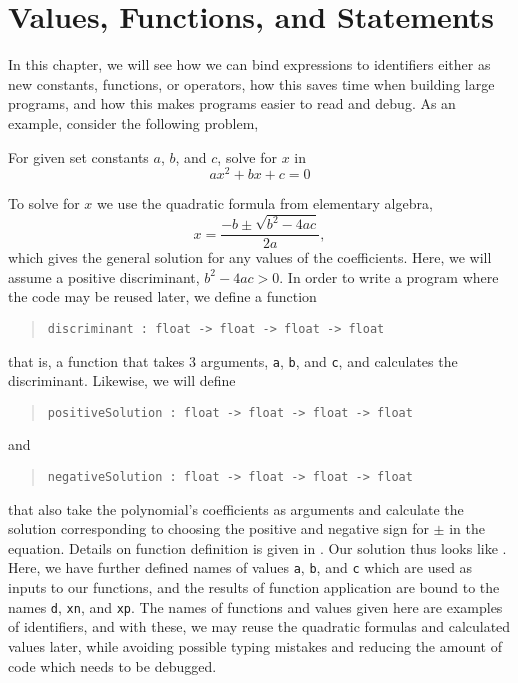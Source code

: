 \documentclass[fsharpNotes.tex]{subfiles}
\begin{document}
\chapter{Values, Functions, and Statements}
\label{chap:let}
%

In this chapter, we will see how we can bind expressions to identifiers either as new constants, functions, or operators, how this saves time when building large programs, and how this makes programs easier to read and debug. As an example, consider the following problem,
\begin{task}
  For given set constants $a$, $b$, and $c$, solve for $x$ in
  \begin{equation}
  a x^2+bx+c = 0
\end{equation}
\end{task}
To solve for $x$ we use the quadratic formula from elementary algebra,
\begin{equation}
  x = \frac{-b\pm\sqrt{b^2-4ac}}{2a},
\end{equation}
which gives the general solution for any values of the coefficients. Here, we will assume a positive discriminant, $b^2-4ac>0$. In order to write a program where the code may be reused later, we define a function
\begin{quote}
  \lstinline!discriminant : float -> float -> float -> float!
\end{quote}
that is, a function that takes 3 arguments, \lstinline!a!, \lstinline!b!, and \lstinline!c!, and calculates the discriminant. Likewise, we will define
\begin{quote}
  \lstinline!positiveSolution : float -> float -> float -> float!
\end{quote}
and
\begin{quote}
  \lstinline!negativeSolution : float -> float -> float -> float!
\end{quote}
that also take the polynomial's coefficients as arguments and calculate the solution corresponding to choosing the positive and negative sign for $\pm$ in the equation. Details on function definition is given in . Our solution thus looks like .
%
%
Here, we have further defined names of values \lstinline!a!, \lstinline!b!, and \lstinline!c! which are used as inputs to our functions, and the results of function application are bound to the names \lstinline!d!, \lstinline!xn!, and \lstinline!xp!. The names of functions and values given here are examples of identifiers, and with these, we may reuse the quadratic formulas and calculated values later, while avoiding possible typing mistakes and reducing the amount of code which needs to be debugged.
\end{document}
